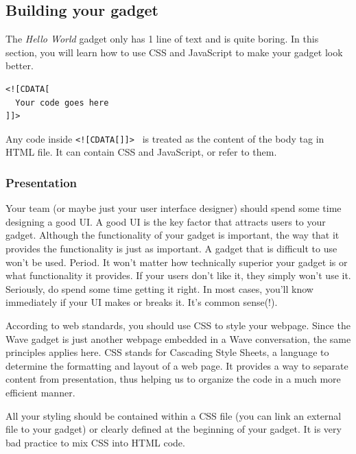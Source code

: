 \subsection{Building your gadget}

The {\em Hello World} gadget only has 1 line of text and is quite
boring. In this section, you will learn how to use CSS and JavaScript
to make your gadget look better.

\begin{verbatim}
<![CDATA[
  Your code goes here
]]>

\end{verbatim} 

Any code inside {\tt <![CDATA[]]> } is treated as the content of the
body tag in HTML file. It can contain CSS and JavaScript, or refer to
them.

\subsubsection{Presentation}

Your team (or maybe just your user interface designer) should spend
some time designing a good UI. A good UI is the key factor that
attracts users to your gadget. Although the functionality of your
gadget is important, the way that it provides the functionality is
just as important. A gadget that is difficult to use won't be used.
Period.  It won't matter how technically superior your gadget is or
what functionality it provides. If your users don't like it, they
simply won't use it. Seriously, do spend some time getting it
right. In most cases, you'll know immediately if your UI makes or
breaks it. It's common sense(!).

According to web standards, you should use CSS to style your
webpage. Since the Wave gadget is just another webpage embedded in a
Wave conversation, the same principles applies here.  CSS stands for
Cascading Style Sheets, a language to determine the formatting and
layout of a web page. It provides a way to separate content from
presentation, thus helping us to organize the code in a much more
efficient manner.

All your styling should be contained within a CSS file (you can link
an external file to your gadget) or clearly defined at the beginning
of your gadget. It is very bad practice to mix CSS into HTML code.


